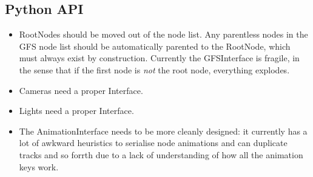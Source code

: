 \documentclass{article}
\begin{document}
\subsection{Python API}
\begin{itemize}
\item RootNodes should be moved out of the node list. Any parentless nodes in the GFS node list should be automatically parented to the RootNode, which must always exist by construction. Currently the GFSInterface is fragile, in the sense that if the first node is \textit{not} the root node, everything explodes.
\item Cameras need a proper Interface.
\item Lights need a proper Interface.
\item The AnimationInterface needs to be more cleanly designed: it currently has a lot of awkward heuristics to serialise node animations and can duplicate tracks and so forrth due to a lack of understanding of how all the animation keys work.
\end{itemize}

\clearpage
\end{document}
